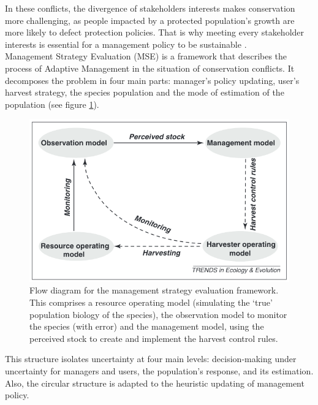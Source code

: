 \documentclass[12pt,a4paper]{article}
\begin{document}
In these conflicts, the divergence of stakeholders interests makes conservation more challenging, as people impacted by a protected population's growth are more likely to defect protection policies.
That is why meeting every stakeholder interests is essential for a management policy to be sustainable \citep{redpath2013understanding}.\\
%

Management Strategy Evaluation (MSE) is a framework that describes the process of Adaptive Management in the situation of conservation conflicts.
It decomposes the problem in four main parts: manager's policy updating, user's harvest strategy, the species population and the mode of estimation of the population (see figure \ref{msediagram}).
\begin{figure}
	\centering
	\includegraphics[scale=0.5]{msediagram.png}
	\caption{Flow diagram for the management strategy evaluation framework. This comprises a resource operating model (simulating the ‘true’ population biology of the species), the observation model to monitor the species (with error) and the management model, using the perceived stock to create and implement the harvest control rules. \citep{BUNNEFELD2011441}}
	\label{msediagram}
\end{figure}
This structure isolates uncertainty at four main levels: decision-making under uncertainty for managers and users, the population's response,
and its estimation.
Also, the circular structure is adapted to the heuristic updating of management policy.
\end{document}
